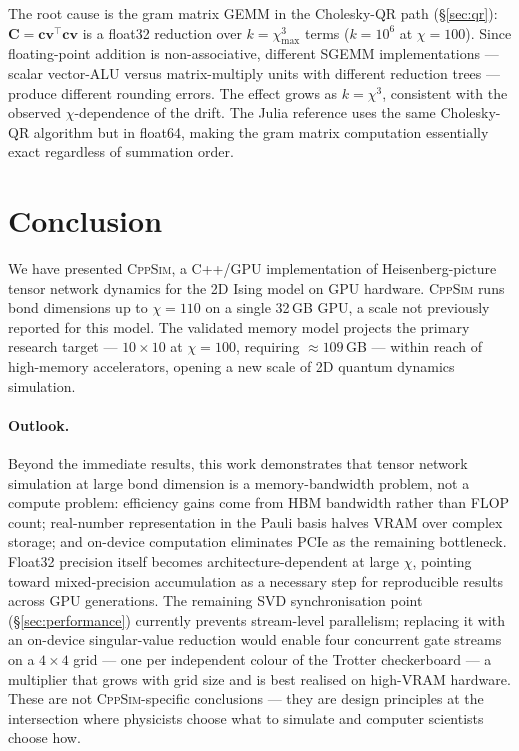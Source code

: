 \documentclass[11pt]{article}
\newcommand{\chimax}{\chi_{\mathrm{max}}}
\begin{document}
The root cause is the gram matrix GEMM in the Cholesky-QR path
(\S\ref{sec:qr}): $\mathbf{C} = \mathbf{cv}^\top \mathbf{cv}$ is a
float32 reduction over $k = \chimax^3$ terms ($k = 10^6$ at $\chi=100$).
Since floating-point addition is non-associative, different SGEMM
implementations --- scalar vector-ALU versus matrix-multiply units with
different reduction trees --- produce different rounding errors.
The effect grows as $k = \chi^3$, consistent with the observed
$\chi$-dependence of the drift.
The Julia reference uses the same Cholesky-QR algorithm but in float64,
making the gram matrix computation essentially exact regardless of
summation order.



\section{Conclusion}
\label{sec:conclusion}

We have presented \textsc{CppSim}, a C++/GPU implementation of Heisenberg-picture
tensor network dynamics for the 2D Ising model on GPU hardware.
\textsc{CppSim} runs bond dimensions up to $\chi=110$ on a single 32\,GB GPU,
a scale not previously reported for this model.
The validated memory model projects the primary research target ---
$10\times10$ at $\chi=100$, requiring $\approx109$\,GB --- within reach of
high-memory accelerators, opening a new scale of 2D quantum dynamics simulation.

\paragraph{Outlook.}
Beyond the immediate results, this work demonstrates that tensor network simulation
at large bond dimension is a memory-bandwidth problem, not a compute problem:
efficiency gains come from HBM bandwidth rather than FLOP count; real-number
representation in the Pauli basis halves VRAM over complex storage; and on-device
computation eliminates PCIe as the remaining bottleneck.
Float32 precision itself becomes architecture-dependent at large $\chi$, pointing
toward mixed-precision accumulation as a necessary step for reproducible results
across GPU generations.
The remaining SVD synchronisation point (\S\ref{sec:performance}) currently
prevents stream-level parallelism; replacing it with an on-device singular-value
reduction would enable four concurrent gate streams on a $4\times4$ grid ---
one per independent colour of the Trotter checkerboard --- a multiplier that
grows with grid size and is best realised on high-VRAM hardware.
These are not \textsc{CppSim}-specific conclusions --- they are design principles
at the intersection where physicists choose what to simulate and computer scientists
choose how.
\end{document}
